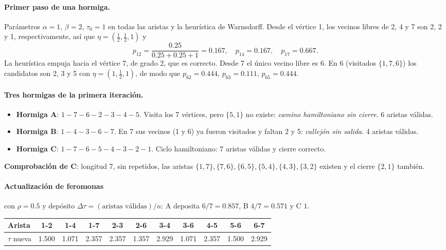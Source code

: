 \documentclass[11pt,letterpaper]{article}
\theoremstyle{definition}
\begin{document}
\paragraph{Primer paso de una hormiga.} Parámetros $\alpha=1$, $\beta=2$, $\tau_0=1$ en
todas las aristas y la heurística de Warnsdorff. Desde el vértice 1, los vecinos libres de
2, 4 y 7 son 2, 2 y 1, respectivamente, así que $\eta=(\tfrac12,\tfrac12,1)$ y
\[
  p_{12}=\frac{0.25}{0.25+0.25+1}=0.167,\quad p_{14}=0.167,\quad p_{17}=0.667.
\]
La heurística empuja hacia el vértice 7, de grado 2, que es correcto. Desde 7 el único
vecino libre es 6. En 6 (visitados $\{1,7,6\}$) los candidatos son 2, 3 y 5 con
$\eta=(1,\tfrac12,1)$, de modo que $p_{62}=0.444$, $p_{63}=0.111$, $p_{65}=0.444$.

\paragraph{Tres hormigas de la primera iteración.}
\begin{itemize}[nosep]
  \item \textbf{Hormiga A}: $1\!-\!7\!-\!6\!-\!2\!-\!3\!-\!4\!-\!5$. Visita los 7 vértices,
        pero $\{5,1\}$ no existe: \emph{camino hamiltoniano sin cierre}. 6 aristas válidas.
  \item \textbf{Hormiga B}: $1\!-\!4\!-\!3\!-\!6\!-\!7$. En 7 sus vecinos (1 y 6) ya fueron
        visitados y faltan 2 y 5: \emph{callejón sin salida}. 4 aristas válidas.
  \item \textbf{Hormiga C}: $1\!-\!7\!-\!6\!-\!5\!-\!4\!-\!3\!-\!2\!-\!1$. Ciclo
        hamiltoniano: 7 aristas válidas y cierre correcto.
\end{itemize}
\textbf{Comprobación de C}: longitud 7, sin repetidos, las aristas
$\{1,7\},\{7,6\},\{6,5\},\{5,4\},\{4,3\},\{3,2\}$ existen y el cierre $\{2,1\}$ también.

\paragraph{Actualización de feromonas} con $\rho=0.5$ y depósito
$\Delta\tau=(\text{aristas válidas})/n$: A deposita $6/7=0.857$, B $4/7=0.571$ y C $1$.

\begin{center}
\begin{tabular}{@{}lcccccccccc@{}}
\toprule
Arista & 1-2 & 1-4 & 1-7 & 2-3 & 2-6 & 3-4 & 3-6 & 4-5 & 5-6 & 6-7 \\
\midrule
$\tau$ nueva & 1.500 & 1.071 & 2.357 & 2.357 & 1.357 & 2.929 & 1.071 & 2.357 & 1.500 & 2.929 \\
\bottomrule
\end{tabular}
\end{center}
\end{document}
